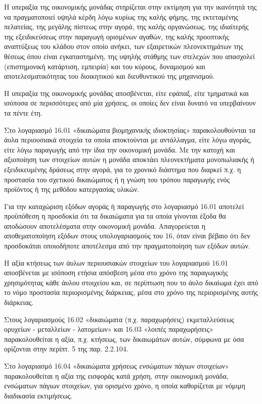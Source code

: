 \documentclass[A4,10pt,greek]{book}
\begin{document}
\begin{enumerate}
Η υπεραξία της οικονομικής μονάδας στηρίζεται στην εκτίμηση για την ικανότητά της να πραγματοποιεί υψηλά κέρδη λόγω κυρίως της καλής φήμης, της εκτεταμένης πελατείας, της μεγάλης πίστεως στην αγορά, της καλής οργανώσεως, της ιδιαίτερής της εξειδικεύσεως στην παραγωγή ορισμένων αγαθών, της καλής προοπτικής αναπτύξεως του κλάδου στον οποίο ανήκει, των εξαιρετικών πλεονεκτημάτων της θέσεως όπου είναι εγκαταστημένη, της υψηλής στάθμης των στελεχών που απασχολεί (επιστημονική κατάρτιση, εμπειρία) και του κύρους, δυναμισμού και αποτελεσματικότητας του διοικητικού και διευθυντικού της μηχανισμού.

Η υπεραξία της οικονομικής μονάδας αποσβένεται, είτε εφάπαξ, είτε τμηματικά και ισόποσα σε περισσότερες από μία χρήσεις, οι οποίες δεν είναι δυνατό να υπερβαίνουν τα πέντε έτη.

Στο λογαριασμό 16.01 «δικαιώματα βιομηχανικής ιδιοκτησίας» παρακολουθούνται τα άυλα περιουσιακά στοιχεία τα οποία αποκτούνται με αντάλλαγμα, είτε λόγω αγοράς, είτε λόγω παραγωγής από την ίδια την οικονομική μονάδα. Με την κατοχή και αξιοποίηση των στοιχείων αυτών η μονάδα αποκτάει πλεονεκτήματα μονοπωλιακής ή εξειδικευμένης δράσεως στην αγορά, για το χρονικό διάστημα που διαρκεί π.χ. η προστασία του σχετικού δικαιώματος ή η γνώση του τρόπου παραγωγής ενός προϊόντος ή της μεθόδου κατεργασίας υλικών.

Για την καταχώριση εξόδων αγοράς ή παραγωγής στο λογαριασμό 16.01 αποτελεί προϋπόθεση η προσδοκία ότι τα δικαιώματα για τα οποία γίνονται έξοδα θα αποδώσουν αποτελέσματα στην οικονομική μονάδα. Απαγορεύεται η αποθεματοποίηση εξόδων στους υπολογαριασμούς του 16, όταν είναι βέβαιο ότι δεν προσδοκάται οποιοδήποτε αποτέλεσμα από την πραγματοποίηση των εξόδων αυτών.

Η αξία κτήσεως των άυλων περιουσιακών στοιχείων του λογαριασμού 16.01 αποσβένεται με ισόποση ετήσια απόσβεση μέσα στο χρόνο της παραγωγικής χρησιμότητας κάθε άυλου στοιχείου και, σε περίπτωση που το άυλο δικαίωμα έχει από το νόμο προστασία περιορισμένης διάρκειας, μέσα στο χρόνο της περιορισμένης αυτής διάρκειας.

Στους λογαριασμούς 16.02 «δικαιώματα (π.χ. παραχωρήσεις) εκμεταλλεύσεως ορυχείων - μεταλλείων - λατομείων» και 16.03 «λοιπές παραχωρήσεις» παρακολουθείται η αξία, π.χ. κτήσεως, των δικαιωμάτων αυτών, σύμφωνα με όσα ορίζονται στην περίπτ. 5 της παρ. 2.2.104.

Στο λογαριασμό 16.04 «δικαιώματα χρήσεως ενσώματων πάγιων στοιχείων» παρακολουθείται η αξία της εισφοράς κατά χρήση, στην οικονομική μονάδα, ενσώματων πάγιων στοιχείων, για ορισμένο χρόνο, η οποία καθορίζεται με νόμιμη διαδικασία εκτιμήσεως.


\end{enumerate}
\end{document}
